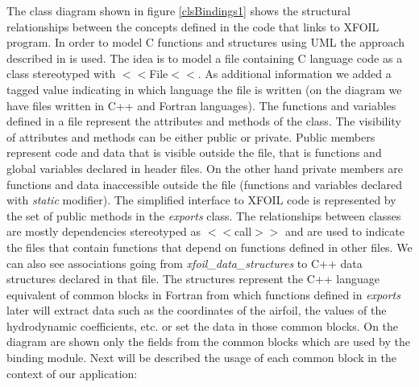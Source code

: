 The class diagram shown in figure \ref{clsBindings1} shows the structural relationships between the concepts defined in the code
that links to XFOIL program. In order to model C functions and structures
using UML the approach described in \cite{CwithUML} is used. The idea is to model a file containing C language code as a class
stereotyped with $<<$File$<<$. As additional information we added a tagged value indicating in which
language the file is written (on the diagram we have files written in C++
and Fortran languages). The functions and variables defined in a file
represent the attributes and methods of the class. The visibility of
attributes and methods can be either public or private. Public members
represent code and data that is visible outside the file, that is functions
and global variables declared in header files. On the other hand private
members are functions and data inaccessible outside the file (functions and
variables declared with \textit{static} modifier). The simplified interface
to XFOIL code is represented by the set of public methods in the \textit{%
exports} class. The relationships between classes are mostly dependencies
stereotyped as $<<$call$>>$ and are used to indicate the files that contain functions that depend on
functions defined in other files. We can also see associations going from 
\textit{xfoil\_data\_structures} to C++ data structures declared in that
file. The structures represent the C++ language equivalent of common blocks
in Fortran from which functions defined in \textit{exports} later will
extract data such as the coordinates of the airfoil, the values of the
hydrodynamic coefficients, etc. or set the data in those common blocks. On
the diagram are shown only the fields from the common blocks which are used
by the binding module. Next will be described the usage of each common block
in the context of our application:

